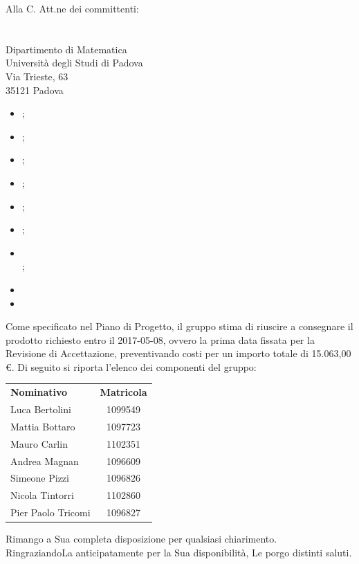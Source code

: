 \documentclass[a4paper,12pt]{letteracdp}
\begin{document}
\begin{letter}{
    Alla C. Att.ne dei committenti: \\
    \COMMITTENTE \\
    \CARDIN      \\
    Dipartimento di Matematica \\
		Università degli Studi di Padova \\
		Via Trieste, 63 \\
		35121 Padova}
    \begin{itemize}
      \item \Gldoc{} \Glfile{};
      \item \NPdoc{} \NPfile{};
      \item \SFdoc{} \SFfile{};
      \item \PPdoc{} \PPfile{};
      \item \PQdoc{} \PQfile{};
      \item \ARdoc{} \ARfile{};
      \item \SDKdoc{} \\ \SDKfile{};
      \item {} 
      \item {} 
    \end{itemize}
    Come specificato nel Piano di Progetto, il gruppo stima di riuscire a
    consegnare il prodotto richiesto entro il 2017-05-08, ovvero la prima data
    fissata per la Revisione di Accettazione, preventivando costi per un importo
    totale di 15.063,00 \euro.
    \newpage
    Di seguito si riporta l'elenco dei componenti del gruppo:\\
    \begin{center}
      \begin{tabular}{l c}
        \textbf{Nominativo} & \textbf{Matricola} \\
        Luca Bertolini 	 	& 1099549  \\
        Mattia Bottaro 	 	& 1097723  \\
        Mauro Carlin 	 	& 1102351  \\
        Andrea Magnan    	& 1096609  \\
        Simeone Pizzi    	& 1096826  \\
        Nicola Tintorri    	& 1102860  \\
        Pier Paolo Tricomi 	& 1096827  \\
      \end{tabular}
    \end{center}
    \closing{Rimango a Sua completa disposizione per qualsiasi chiarimento. \\
	RingraziandoLa anticipatamente per la Sua disponibilità, Le porgo distinti saluti.}
  \end{letter}
\end{document}
